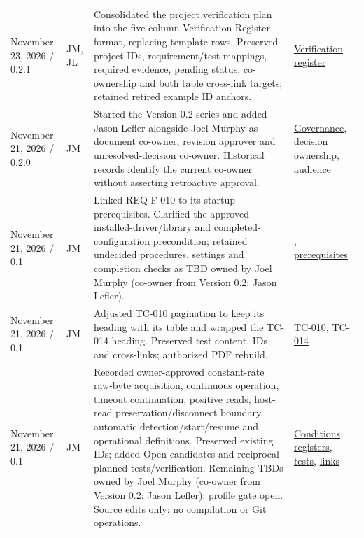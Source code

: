 \begin{tabularx}{\linewidth}{L{3.1cm}L{2.2cm}YL{2.0cm}}
November 23, 2026 / 0.2.1 & JM, JL & Consolidated the project verification plan into the five-column Verification Register format, replacing template rows. Preserved project IDs, requirement/test mappings, required evidence, pending status, co-ownership and both table cross-link targets; retained retired example ID anchors. & \hyperref[Table:VerificationRegister]{Verification register}\\

November 21, 2026 / 0.2.0 & JM & Started the Version 0.2 series and added Jason Lefler alongside Joel Murphy as document co-owner, revision approver and unresolved-decision co-owner. Historical records identify the current co-owner without asserting retroactive approval. & \hyperref[Section:ProjectGovernance]{Governance}, \hyperref[Section:TBDDecisionOwnership]{decision ownership}, \hyperref[Section:ProjectStakeholders]{audience}\\

November 21, 2026 / 0.1 & JM & Linked REQ-F-010 to its startup prerequisites. Clarified the approved installed-driver/library and completed-configuration precondition; retained undecided procedures, settings and completion checks as TBD owned by Joel Murphy (co-owner from Version 0.2: Jason Lefler). & , \hyperref[Section:ProjectStartupPrerequisites]{prerequisites}\\

November 21, 2026 / 0.1 & JM & Adjusted TC-010 pagination to keep its heading with its table and wrapped the TC-014 heading. Preserved test content, IDs and cross-links; authorized PDF rebuild. & \hyperref[Table:ProjectTC010]{TC-010}, \hyperref[Table:ProjectTC-014]{TC-014}\\

November 21, 2026 / 0.1 & JM & Recorded owner-approved constant-rate raw-byte acquisition, continuous operation, timeout continuation, positive reads, host-read preservation/disconnect boundary, automatic detection/start/resume and operational definitions. Preserved existing IDs; added Open candidates and reciprocal planned tests/verification. Remaining TBDs owned by Joel Murphy (co-owner from Version 0.2: Jason Lefler); profile gate open. Source edits only: no compilation or Git operations. & \hyperref[Section:ProjectAcquisitionConditions]{Conditions}, \hyperref[Section:ProjectRequirements]{registers}, \hyperref[Section:ProjectUseCaseTestPlan]{tests}, \hyperref[Table:ProjectRequirementTraceability]{links}\\


\end{tabularx}
